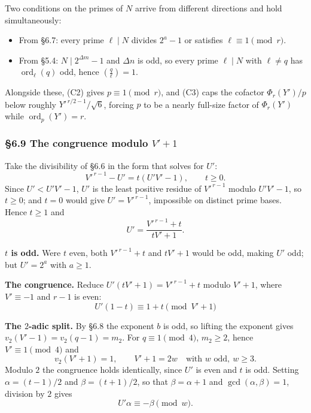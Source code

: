 \documentclass[11pt]{article}
\begin{document}
Two conditions on the primes of $N$ arrive from different directions and hold simultaneously:
\begin{itemize}
\item From \S6.7: every prime $\ell \mid N$ divides $2^{a}-1$ or satisfies $\ell \equiv 1 \pmod r$.
\item From \S5.4: $N \mid 2^{\Delta m}-1$ and $\Delta n$ is odd, so every prime $\ell \mid N$ with $\ell \neq q$ has $\operatorname{ord}_\ell(q)$ odd, hence $\left(\frac{q}{\ell}\right) = 1$.
\end{itemize}
Alongside these, (C2) gives $p \equiv 1 \pmod r$, and (C3) caps the cofactor $\Phi_r(Y')/p$ below roughly $Y'^{\,r/2-1}/\sqrt6$, forcing $p$ to be a nearly full-size factor of $\Phi_r(Y')$ while $\operatorname{ord}_p(Y') = r$.

\subsubsection*{\S6.9 The congruence modulo $V'+1$}

Take the divisibility of \S6.6 in the form that solves for $U'$:
\[
V'^{\,r-1} - U' = t\left(U'V'-1\right), \qquad t \geq 0 .
\]
Since $U' < U'V'-1$, $U'$ is the least positive residue of $V'^{\,r-1}$ modulo $U'V'-1$, so $t \geq 0$; and $t = 0$ would give $U' = V'^{\,r-1}$, impossible on distinct prime bases. Hence $t \geq 1$ and
\[
U' = \frac{V'^{\,r-1}+t}{tV'+1} .
\]

\medskip
\noindent\textbf{$t$ is odd.} Were $t$ even, both $V'^{\,r-1}+t$ and $tV'+1$ would be odd, making $U'$ odd; but $U' = 2^{a}$ with $a \geq 1$.

\medskip
\noindent\textbf{The congruence.} Reduce $U'\left(tV'+1\right) = V'^{\,r-1}+t$ modulo $V'+1$, where $V' \equiv -1$ and $r-1$ is even:
\[
\boxed{\,U'(1-t) \equiv 1+t \pmod{V'+1}\,}
\]

\medskip
\noindent\textbf{The $2$-adic split.} By \S6.8 the exponent $b$ is odd, so lifting the exponent gives $v_2(V'-1) = v_2(q-1) = m_2$. For $q \equiv 1 \pmod 4$, $m_2 \geq 2$, hence $V' \equiv 1 \pmod 4$ and
\[
v_2(V'+1) = 1, \qquad V'+1 = 2w \quad\text{with } w \text{ odd},\ w \geq 3 .
\]
Modulo $2$ the congruence holds identically, since $U'$ is even and $t$ is odd. Setting $\alpha = (t-1)/2$ and $\beta = (t+1)/2$, so that $\beta = \alpha+1$ and $\gcd(\alpha,\beta) = 1$, division by $2$ gives
\[
U'\alpha \equiv -\beta \pmod{w} .
\]
\end{document}

